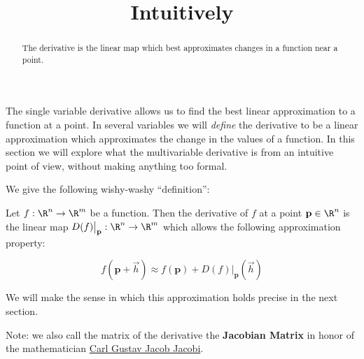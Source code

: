 \documentclass{ximera}
\title{Intuitively}
\begin{document}
\begin{abstract}
  The derivative is the linear map which best approximates changes in a function near a point.
\end{abstract}

The single variable derivative allows us to find the best linear
approximation to a function at a point.  In several variables we will
\textit{define} the derivative to be a linear approximation which
approximates the change in the values of a function.  In this section
we will explore what the multivariable derivative is from an intuitive
point of view, without making anything too formal.

We give the following wishy-washy ``definition'':

\begin{definition}
	Let $f:\R^n \to \R^m$ be a function.  Then the derivative of $f$ at a point $\mathbf{p} \in \R^n$ is the linear map $D(f)\big|_{\mathbf{p}}:\R^n \to \R^m$ 
	which allows the following approximation property:
	
	\[
		f(\mathbf{p} + \vec{h}) \approx f(\mathbf{p}) + D(f)\big|_{\mathbf{p}}(\vec{h})
	\]
	
	We will make the sense in which this approximation holds precise in the next section.
\end{definition}

Note:  we also call the matrix of the derivative the \textbf{Jacobian Matrix} in honor of the mathematician 
\href{http://en.wikipedia.org/wiki/Carl_Gustav_Jacob_Jacobi}{Carl Gustav Jacob Jacobi}.
\end{document}
